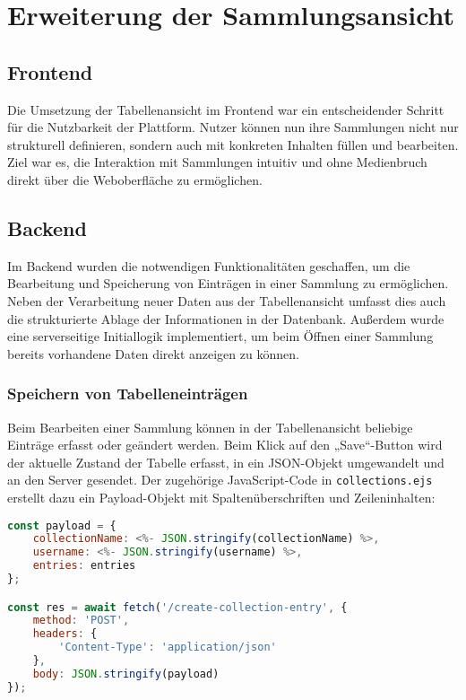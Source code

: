 \section{Erweiterung der Sammlungsansicht}\label{sec:erweiterung-der-sammlungsansicht}


\subsection{Frontend}

Die Umsetzung der Tabellenansicht im Frontend war ein entscheidender Schritt für die Nutzbarkeit der Plattform.
Nutzer können nun ihre Sammlungen nicht nur strukturell definieren, sondern auch mit konkreten Inhalten füllen und bearbeiten.
Ziel war es, die Interaktion mit Sammlungen intuitiv und ohne Medienbruch direkt über die Weboberfläche zu ermöglichen.

\subsection{Backend}

Im Backend wurden die notwendigen Funktionalitäten geschaffen, um die Bearbeitung und Speicherung von Einträgen in einer Sammlung zu ermöglichen.
Neben der Verarbeitung neuer Daten aus der Tabellenansicht umfasst dies auch die strukturierte Ablage der Informationen in der Datenbank.
Außerdem wurde eine serverseitige Initiallogik implementiert, um beim Öffnen einer Sammlung bereits vorhandene Daten direkt anzeigen zu können.

\subsubsection{Speichern von Tabelleneinträgen}

Beim Bearbeiten einer Sammlung können in der Tabellenansicht beliebige Einträge erfasst oder geändert werden.
Beim Klick auf den „Save“-Button wird der aktuelle Zustand der Tabelle erfasst, in ein JSON-Objekt umgewandelt und an den Server gesendet.
Der zugehörige JavaScript-Code in \texttt{collections.ejs} erstellt dazu ein Payload-Objekt mit Spaltenüberschriften und Zeileninhalten:

\begin{lstlisting}[language=JavaScript, caption=Payload-Erstellung im Frontend]
const payload = {
    collectionName: <%- JSON.stringify(collectionName) %>,
    username: <%- JSON.stringify(username) %>,
    entries: entries
};

const res = await fetch('/create-collection-entry', {
    method: 'POST',
    headers: {
        'Content-Type': 'application/json'
    },
    body: JSON.stringify(payload)
});
\end{lstlisting}


